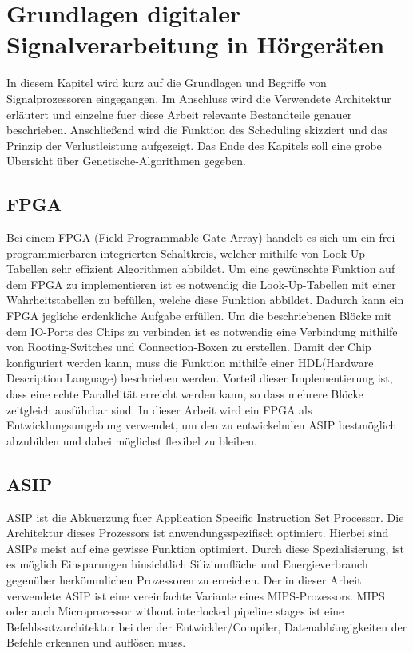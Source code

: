 \chapter{Grundlagen digitaler Signalverarbeitung in Hörgeräten}
\label{chap:grundlagen}
In diesem Kapitel wird kurz auf die Grundlagen und Begriffe von Signalprozessoren eingegangen. Im Anschluss wird die Verwendete Architektur erläutert und einzelne fuer diese Arbeit relevante Bestandteile genauer beschrieben. Anschließend wird die Funktion des Scheduling skizziert und das Prinzip der Verlustleistung aufgezeigt. Das Ende des Kapitels soll eine grobe Übersicht über Genetische-Algorithmen gegeben.

\section{FPGA}
Bei einem FPGA (Field Programmable Gate Array) handelt es sich um ein frei programmierbaren integrierten Schaltkreis, welcher mithilfe von Look-Up-Tabellen sehr effizient Algorithmen abbildet. Um eine gewünschte Funktion auf dem FPGA zu implementieren ist es notwendig die Look-Up-Tabellen mit einer Wahrheitstabellen zu befüllen, welche diese Funktion abbildet. Dadurch kann ein FPGA jegliche erdenkliche Aufgabe erfüllen. Um die beschriebenen Blöcke mit dem IO-Ports des Chips zu verbinden ist es notwendig eine Verbindung mithilfe von Rooting-Switches und Connection-Boxen zu erstellen. Damit der Chip konfiguriert werden kann, muss die Funktion mithilfe einer HDL(Hardware Description Language) beschrieben werden.\cite{farooq2012fpga} Vorteil dieser Implementierung ist, dass eine echte Parallelität erreicht werden kann, so dass mehrere Blöcke zeitgleich ausführbar sind. In dieser Arbeit wird ein FPGA als Entwicklungsumgebung verwendet, um den zu entwickelnden ASIP bestmöglich abzubilden und dabei möglichst flexibel zu bleiben.


\section{ASIP}
ASIP ist die Abkuerzung fuer Application Specific Instruction Set Processor. Die Architektur dieses Prozessors ist anwendungsspezifisch optimiert. Hierbei sind ASIPs meist auf eine gewisse Funktion optimiert. Durch diese Spezialisierung, ist es möglich Einsparungen hinsichtlich Siliziumfläche und Energieverbrauch gegenüber herkömmlichen Prozessoren zu erreichen. Der in dieser Arbeit verwendete ASIP ist eine vereinfachte Variante eines MIPS-Prozessors. MIPS oder auch \glqq Microprocessor without interlocked pipeline stages\grqq{} ist eine Befehlssatzarchitektur bei der der Entwickler/Compiler, Datenabhängigkeiten der Befehle erkennen und auflösen muss.

